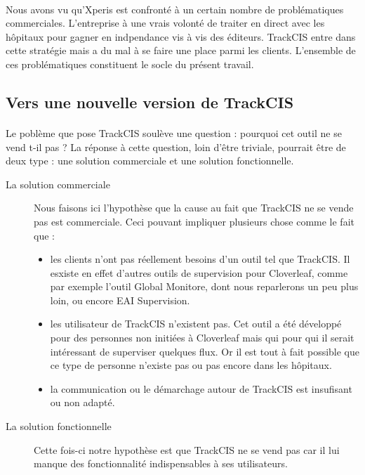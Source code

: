 			\paragraph{}%
			
			\paragraph{}
			Nous avons vu qu'Xperis est confronté à un certain nombre de problématiques
			commerciales. L'entreprise à une vrais volonté de traiter en direct avec les
			hôpitaux pour gagner en indpendance vis à vis des éditeurs. TrackCIS entre
			dans cette stratégie mais a du mal à se faire une place parmi les
			clients.\newline
			L'ensemble de ces problématiques constituent le socle du présent travail.
	
	\subsection{Vers une nouvelle version de TrackCIS}
		\paragraph{}%
		Le poblème que pose TrackCIS soulève une question : pourquoi cet outil ne se
		vend t-il pas ? La réponse à cette question, loin d'être triviale, pourrait
		être de deux type : une solution commerciale et une solution fonctionnelle.
		\begin{description}
			\item[La solution commerciale] Nous faisons ici l'hypothèse que la cause au
			fait que TrackCIS ne se vende pas est commerciale. Ceci pouvant impliquer
			plusieurs chose comme le fait que :
			\begin{itemize}
			  \item les clients n'ont pas réellement besoins d'un outil tel que TrackCIS.
			  Il esxiste en effet d'autres outils de supervision pour Cloverleaf, comme
			  par exemple l'outil Global Monitore, dont nous reparlerons un peu plus
			  loin, ou encore EAI Supervision.
			  \item les utilisateur de TrackCIS n'existent pas. Cet outil a été développé
			  pour des personnes non initiées à Cloverleaf mais qui pour qui il serait
			  intéressant de superviser quelques flux.
			  Or il est tout à fait possible que ce type de personne n'existe pas ou pas
			  encore dans les hôpitaux.
			  \item la communication ou le démarchage autour de TrackCIS est insufisant
			  ou non adapté.
			\end{itemize}
			\item[La solution fonctionnelle] Cette fois-ci notre hypothèse est que
			TrackCIS ne se vend pas car il lui manque des fonctionnalité indispensables à
			ses utilisateurs.
		\end{description}
		
